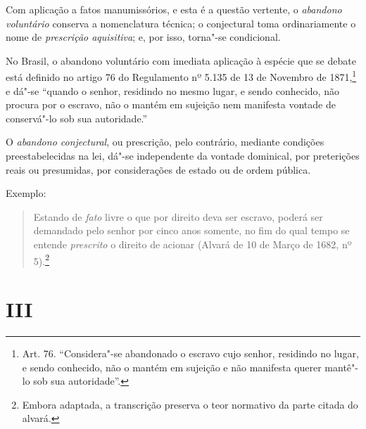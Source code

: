 Com aplicação a fatos manumissórios, e esta é a questão vertente, o
\emph{abandono voluntário} conserva a nomenclatura técnica; o
conjectural toma ordinariamente o nome de \emph{prescrição aquisitiva};
e, por isso, torna"-se condicional.

No Brasil, o abandono voluntário com imediata aplicação à espécie que se
debate está definido no artigo 76 do Regulamento nº 5.135 de 13 de
Novembro de 1871,\footnote{Art. 76. ``Considera"-se abandonado o escravo
  cujo senhor, residindo no lugar, e sendo conhecido, não o mantém em
  sujeição e não manifesta querer mantê"-lo sob sua autoridade''.} e dá"-se
``quando o senhor, residindo no mesmo lugar, e sendo conhecido, não
procura por o escravo, não o mantém em sujeição nem manifesta vontade de
conservá"-lo sob sua autoridade.''

O \emph{abandono conjectural}, ou prescrição, pelo contrário, mediante
condições preestabelecidas na lei, dá"-se independente da vontade
dominical, por preterições reais ou presumidas, por considerações de
estado ou de ordem pública.

Exemplo:

\begin{quote}
Estando de \emph{fato} livre o que por direito deva ser escravo, poderá
ser demandado pelo senhor por cinco anos somente, no fim do qual tempo
se entende \emph{prescrito} o direito de acionar (Alvará de 10 de Março
de 1682, nº 5).\footnote{Embora adaptada, a transcrição preserva o
  teor normativo da parte citada do alvará.}
\end{quote}

\section*{III}

